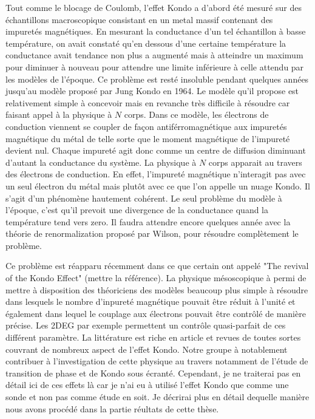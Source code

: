 Tout comme le blocage de Coulomb, l'effet Kondo a d'abord été mesuré sur des échantillons macroscopique consistant en un metal massif contenant des impuretés magnétiques. En mesurant la conductance d'un tel échantillon à basse température, on avait constaté  qu'en dessous d'une certaine température la conductance avait tendance non plus a augmenté mais à atteindre un maximum pour diminuer à nouveau pour attendre une limite inférieure à celle attendu par les modèles de l'époque. Ce problème est resté insoluble pendant quelques années jusqu'au modèle proposé par Jung Kondo en 1964. Le modèle qu'il propose est relativement simple à concevoir mais en revanche très difficile à résoudre car faisant appel à la physique à $N$ corps. Dans ce modèle, les électrons de conduction viennent se coupler de façon antiférromagnétique aux impuretés magnétique du métal de telle sorte que le moment magnétique de l'impureté devient nul. Chaque impureté agit donc comme un centre de diffusion diminuant d'autant la conductance du système. La physique à $N$ corps apparait au travers des électrons de conduction. En effet, l'impureté magnétique n'interagit pas avec un seul électron du métal mais plutôt avec ce que l'on appelle un nuage Kondo. Il s'agit d'un phénomène hautement cohérent. Le seul problème du modèle à l'époque, c'est qu'il prevoit une divergence de la conductance quand la température tend vers zero. Il faudra attendre encore quelques année avec la théorie de renormalization proposé par Wilson, pour résoudre complètement le problème.

Ce problème est réapparu récemment dans ce que certain ont appelé "The revival of the Kondo Effect" (mettre la référence). La physique mésoscopique à permi de mettre à disposition des théoriciens des modèles beaucoup plus simple à résoudre dans lesquels le nombre d'inpureté magnétique pouvait être réduit à l'unité et également dans lequel le couplage aux électrons pouvait être contrôlé de manière précise. Les 2DEG par exemple permettent un contrôle quasi-parfait de ces différent paramètre. La littérature est riche en article et revues de toutes sortes couvrant de nombreux aspect de l'effet Kondo. Notre groupe à notablement contribuer à l'investigation de cette physique au travers notamment de l'étude de transition de phase et de Kondo sous écranté. Cependant, je ne traiterai pas en détail ici de ces effets là car je n'ai eu à utilisé l'effet Kondo que comme une sonde et non pas comme étude en soit. Je décrirai plus en détail dequelle manière nous avons procédé dans la partie réultats de cette thèse.

